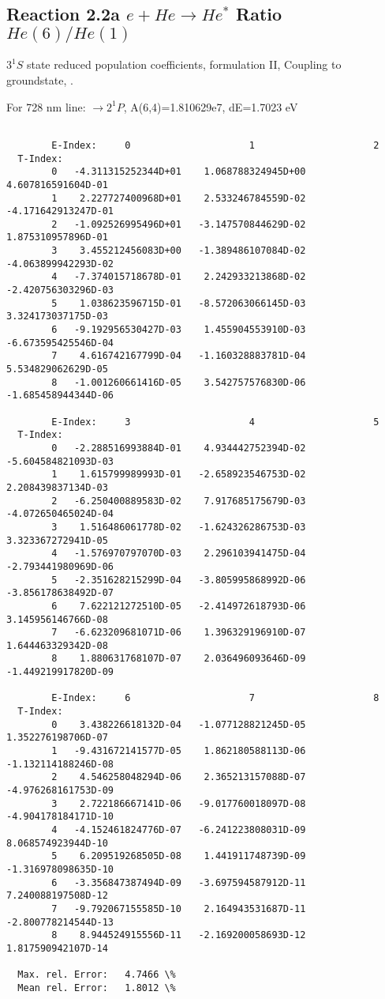 \documentclass[12pt,dvipdfmx]{article}
\begin{document}
\subsection{
  Reaction 2.2a $e + He \rightarrow He^*  $ Ratio $He(6)/He(1)$
}

  $3^1S$ state
  reduced population coefficients, formulation II,
  Coupling to groundstate, \cite{kn:Fujimoto}.

  For 728 nm line:  $\rightarrow 2^1P$, A(6,4)=1.810629e7, dE=1.7023 eV

\begin{small}\begin{verbatim}

        E-Index:     0                     1                     2
  T-Index:
        0   -4.311315252344D+01    1.068788324945D+00    4.607816591604D-01
        1    2.227727400968D+01    2.533246784559D-02   -4.171642913247D-01
        2   -1.092526995496D+01   -3.147570844629D-02    1.875310957896D-01
        3    3.455212456083D+00   -1.389486107084D-02   -4.063899942293D-02
        4   -7.374015718678D-01    2.242933213868D-02   -2.420756303296D-03
        5    1.038623596715D-01   -8.572063066145D-03    3.324173037175D-03
        6   -9.192956530427D-03    1.455904553910D-03   -6.673595425546D-04
        7    4.616742167799D-04   -1.160328883781D-04    5.534829062629D-05
        8   -1.001260661416D-05    3.542757576830D-06   -1.685458944344D-06

        E-Index:     3                     4                     5
  T-Index:
        0   -2.288516993884D-01    4.934442752394D-02   -5.604584821093D-03
        1    1.615799989993D-01   -2.658923546753D-02    2.208439837134D-03
        2   -6.250400889583D-02    7.917685175679D-03   -4.072650465024D-04
        3    1.516486061778D-02   -1.624326286753D-03    3.323367272941D-05
        4   -1.576970797070D-03    2.296103941475D-04   -2.793441980969D-06
        5   -2.351628215299D-04   -3.805995868992D-06   -3.856178638492D-07
        6    7.622121272510D-05   -2.414972618793D-06    3.145956146766D-08
        7   -6.623209681071D-06    1.396329196910D-07    1.644463329342D-08
        8    1.880631768107D-07    2.036496093646D-09   -1.449219917820D-09

        E-Index:     6                     7                     8
  T-Index:
        0    3.438226618132D-04   -1.077128821245D-05    1.352276198706D-07
        1   -9.431672141577D-05    1.862180588113D-06   -1.132114188246D-08
        2    4.546258048294D-06    2.365213157088D-07   -4.976268161753D-09
        3    2.722186667141D-06   -9.017760018097D-08   -4.904178184171D-10
        4   -4.152461824776D-07   -6.241223808031D-09    8.068574923944D-10
        5    6.209519268505D-08    1.441911748739D-09   -1.316978098635D-10
        6   -3.356847387494D-09   -3.697594587912D-11    7.240088197508D-12
        7   -9.792067155585D-10    2.164943531687D-11   -2.800778214544D-13
        8    8.944524915556D-11   -2.169200058693D-12    1.817590942107D-14

  Max. rel. Error:   4.7466 \%
  Mean rel. Error:   1.8012 \%



\end{verbatim}\end{small}
\end{document}
